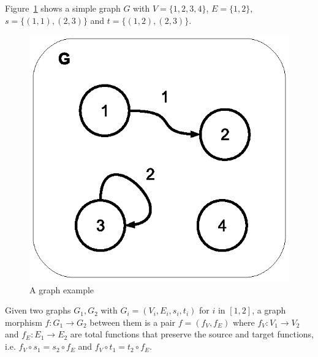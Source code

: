 \begin{example}[Graph]\label{def:graph} Figure~\ref{fig:gts:graph} shows a simple graph $G$ with $V = \{1,2,3,4\}$, $E = \{1,2\}$, $s =\{(1,1),(2,3)\}$ and $t = \{(1,2),(2,3)\}$.
\begin{figure}[!ht]
  \centering
  \includegraphics[scale=0.8]{images/gts/graph}
  \caption{A graph example}\label{fig:gts:graph}
\end{figure}
\end{example}

\begin{definition}\label{def:graph-morphism} Given two graphs $G_1,G_2$ with \mbox{$G_i = \left(V_i, E_i, s_i, t_i\right)$} for $i$ in $[1,2]$, a graph morphism $f : G_1 \rightarrow G_2$ between them is a pair $f = \left(f_V,f_E\right)$ where $f_V : V_1 \rightarrow V_2$ and $f_E : E_1 \rightarrow E_2$ are total functions that preserve the source and target functions, i.e. $f_V \circ s_1 = s_2 \circ f_E$ and $f_V \circ t_1 = t_2 \circ f_E$.
\end{definition}

